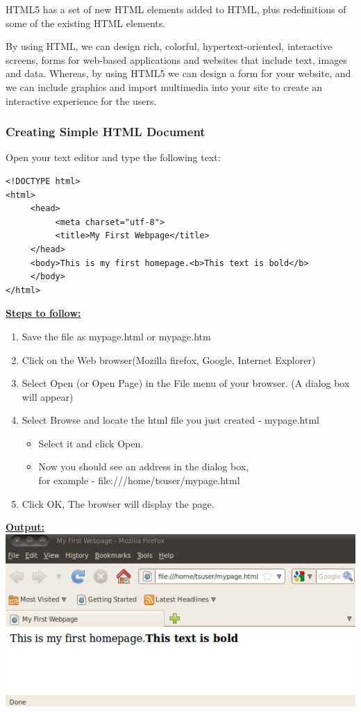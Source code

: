 \documentclass[11pt,a4paper]{article}
\begin{document}
HTML5 has a set of new HTML elements added to HTML, plus redefinitions of some of the existing HTML elements.

By using HTML, we can design rich, colorful, hypertext-oriented, interactive screens, forms for web-based applications and websites that include text, images and data. Whereas, by using HTML5 we can design a form for your website, and we can include graphics and import multimedia into your site to create an interactive experience for the users.

\subsubsection*{Creating Simple HTML Document}
Open your text editor and type the following text:
\begin{verbatim}
<!DOCTYPE html>
<html>
     <head>
          <meta charset="utf-8">
          <title>My First Webpage</title>
     </head>
     <body>This is my first homepage.<b>This text is bold</b>
     </body>
</html>
\end{verbatim}

\underline{{\large{\textbf{Steps to follow:}}}}
\begin{enumerate}
\item Save the file as mypage.html or mypage.htm
\item Click on the Web browser(Mozilla firefox, Google, Internet Explorer)
\item Select Open (or Open Page) in the File menu of your browser. (A dialog box will appear)
\item Select Browse and locate the html file you just created - mypage.html
\begin{itemize}
\item  Select it and click Open.
\item  Now you should see an address in the dialog box,\\ for example - file:///home/tsuser/mypage.html
\end{itemize}
\item Click OK, The browser will display the page.
\end{enumerate}

\underline{{\large{\textbf{Output:}}}}\\

\includegraphics[scale=0.6]{First.png}
\end{document}
